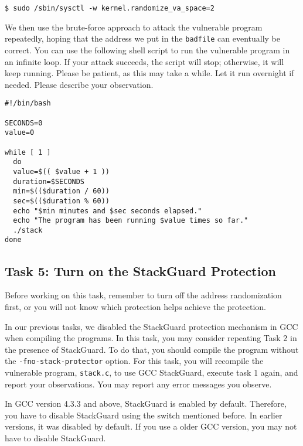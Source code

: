 \begin{lstlisting}
$ sudo /sbin/sysctl -w kernel.randomize_va_space=2
\end{lstlisting}


We then use the brute-force approach to attack the vulnerable program repeatedly, hoping that 
the address we put in the \texttt{badfile} can eventually be correct. You can 
use the following shell script to run the vulnerable program in an infinite loop. If your
attack succeeds, the script will stop; otherwise, it will keep running. Please be patient,
as this may take a while. Let it run overnight if needed. Please describe your observation.


\begin{lstlisting}
#!/bin/bash

SECONDS=0
value=0

while [ 1 ]
  do
  value=$(( $value + 1 ))
  duration=$SECONDS
  min=$(($duration / 60))
  sec=$(($duration % 60))
  echo "$min minutes and $sec seconds elapsed."
  echo "The program has been running $value times so far."
  ./stack
done
\end{lstlisting}



\subsection{Task 5: Turn on the StackGuard Protection}

Before working on this task, remember to turn off the address
randomization first, or you will not know which protection helps 
achieve the protection.

In our previous tasks, we disabled the StackGuard protection mechanism in GCC
when compiling the programs. In this task, you may consider repeating
Task 2 
in the presence of StackGuard. To do that, you should compile
the program without the \texttt{-fno-stack-protector} option. For this
task, you will recompile the vulnerable program, \texttt{stack.c}, 
to use GCC StackGuard, execute task 1 again, and report your observations. You may
report any error messages you observe.

In GCC version 4.3.3 and above, StackGuard is enabled by
default. Therefore, you have to disable StackGuard using the switch
mentioned before. In earlier versions, it was disabled by default. If
you use a older GCC version, you may not have to disable StackGuard. 



